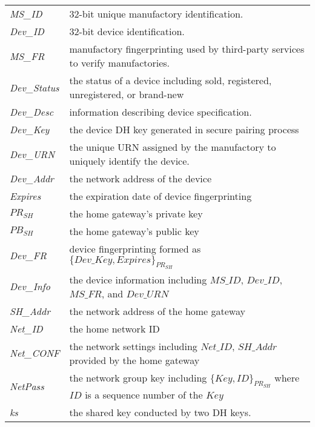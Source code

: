 \begin{longtable}[l]{p{100pt} p{250pt}}
\emph{MS\_ID} & 32-bit unique manufactory identification. \\ 
\emph{Dev\_ID} & 32-bit device identification. \\ 
\emph{MS\_FR} & manufactory fingerprinting used by third-party services to verify manufactories. \\ 
\emph{Dev\_Status} & the status of a device including sold, registered, unregistered, or brand-new \\ 
\emph{Dev\_Desc} & information describing device specification. \\ 
\emph{Dev\_Key} & the device DH key generated in secure pairing process \\ 
\emph{Dev\_URN} & the unique URN assigned by the manufactory to uniquely identify the device. \\ 
\emph{Dev\_Addr} & the network address of the device \\ 
\emph{Expires} & the expiration date of device fingerprinting \\ 
$PR_{SH}$ & the home gateway's private key \\ 
$PB_{SH}$ & the home gateway's public key \\  
\emph{Dev\_FR} & device fingerprinting formed as $\{Dev\_Key, Expires\}_{PR_{SH}}$ \\ 
\emph{Dev\_Info} & the device information including $MS\_ID$, $Dev\_ID$, $MS\_FR$, and $Dev\_URN$ \\  
\emph{SH\_Addr} & the network address of the home gateway \\ 
\emph{Net\_ID} & the home network ID \\ 
\emph{Net\_CONF} & the network settings including $Net\_ID$, $SH\_Addr$ provided by the home gateway \\ 
\emph{NetPass} & the network group key including $\{Key,ID\}_{PR_{SH}}$ where $ID$ is a sequence number of the $Key$ \\ 
\emph{ks} & the shared key conducted by two DH keys. \\ 


\end{longtable} 